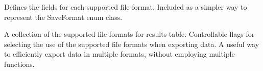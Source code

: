 \documentclass[letterpaper,10pt,english]{sphinxmanual}
\begin{document}
\begin{fulllineitems}
\label{\detokenize{modules/output/formats:qnav.output.formats.FileFormat}}
\pysigstartsignatures
{}
\pysigstopsignatures
\sphinxAtStartPar
Defines the fields for each supported file format.
Included as a simpler way to represent the SaveFormat enum class.

\end{fulllineitems}


\begin{fulllineitems}
\label{\detokenize{modules/output/formats:qnav.output.formats.SaveFormat}}
\pysigstartsignatures
{}
\pysigstopsignatures
\sphinxAtStartPar
A collection of the supported file formats for results table.
Controllable flags for selecting the use of the supported file formats
when exporting data. A useful way to efficiently export data in
multiple formats, without employing multiple functions.

\end{fulllineitems}

\end{document}
